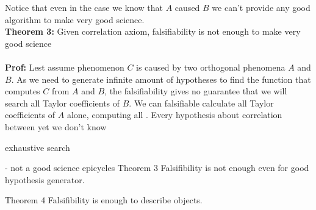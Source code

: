 \documentclass{article}
\begin{document}
Notice that even in the case we know that $A$ caused $B$ we can't provide any good algorithm to make very good science.\\ 

\textbf{Theorem 3:}  Given correlation axiom, falsifiability is not enough to make very good science \\\\
\textbf{Prof:} 
Lest assume phenomenon $C$ is caused by two orthogonal phenomena $A$ and $B$. As we need to generate infinite amount of hypotheses to find the function that computes $C$ from $A$ and $B$, the falsifiability gives no guarantee that we will search all Taylor coefficients of $B$. We can falsifiable calculate all Taylor coefficients of $A$ alone, computing all . Every hypothesis about correlation between yet we don't know 

exhaustive search


- not a good science epicycles
Theorem 3 Falsifibility is not enough even for good hypothesis generator. 

Theorem 4 Falsifibility is enough to describe objects. 
\end{document}
